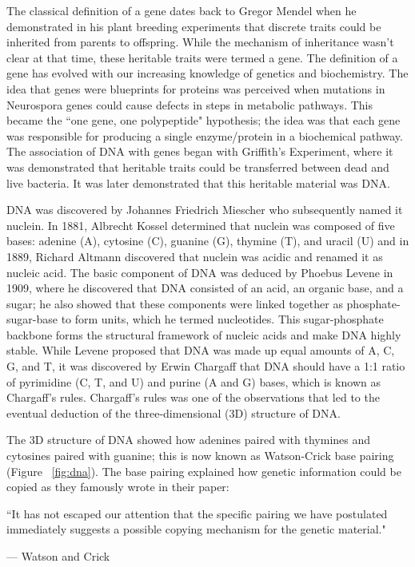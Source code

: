 The classical definition of a gene dates back to Gregor Mendel when he demonstrated in his plant breeding experiments that discrete traits could be inherited from parents to offspring. While the mechanism of inheritance wasn't clear at that time, these heritable traits were termed a gene. The definition of a gene has evolved with our increasing knowledge of genetics and biochemistry\cite{pmid17567988}. The idea that genes were blueprints for proteins was perceived when mutations in Neurospora genes could cause defects in steps in metabolic pathways\cite{pmid16578042}. This became the ``one gene, one polypeptide" hypothesis; the idea was that each gene was responsible for producing a single enzyme/protein in a biochemical pathway. The association of DNA with genes began with Griffith's Experiment\cite{griffith1928significance}, where it was demonstrated that heritable traits could be transferred between dead and live bacteria. It was later demonstrated that this heritable material was DNA\cite{avery1944studies}.

DNA was discovered by Johannes Friedrich Miescher who subsequently named it nuclein. In 1881, Albrecht Kossel determined that nuclein was composed of five bases: adenine (A), cytosine (C), guanine (G), thymine (T), and uracil (U) and in 1889, Richard Altmann discovered that nuclein was acidic and renamed it as nucleic acid. The basic component of DNA was deduced by Phoebus Levene in 1909, where he discovered that DNA consisted of an acid, an organic base, and a sugar; he also showed that these components were linked together as phosphate-sugar-base to form units, which he termed nucleotides. This sugar-phosphate backbone forms the structural framework of nucleic acids and make DNA highly stable. While Levene proposed that DNA was made up equal amounts of A, C, G, and T, it was discovered by Erwin Chargaff that DNA should have a 1:1 ratio of pyrimidine (C, T, and U) and purine (A and G) bases, which is known as Chargaff's rules. Chargaff's rules was one of the observations that led to the eventual deduction of the three-dimensional (3D) structure of DNA.

The 3D structure of DNA showed how adenines paired with thymines and cytosines paired with guanine\cite{WATSON_1953}; this is now known as Watson-Crick base pairing (Figure ~\ref{fig:dna}). The base pairing explained how genetic information could be copied as they famously wrote in their paper:

\epigraph{``It has not escaped our attention that the specific pairing we have postulated immediately suggests a possible copying mechanism for the genetic material."}{--- \textup{Watson and Crick}}

